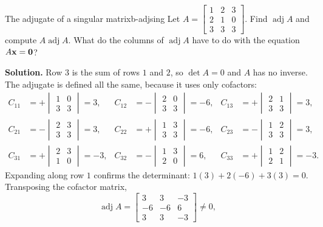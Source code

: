 \documentclass[11pt]{article}
\begin{document}
\begin{exmp}{The adjugate of a singular matrix}{b-adjsing}
Let $A=\begin{bmatrix}1&2&3\\2&1&0\\3&3&3\end{bmatrix}$. Find $\operatorname{adj}A$ and compute $A\operatorname{adj}A$. What do the columns of $\operatorname{adj}A$ have to do with the equation $A\mathbf{x}=\mathbf{0}$?

\textbf{Solution.} Row $3$ is the sum of rows $1$ and $2$, so $\det A=0$ and $A$ has no inverse. The adjugate is defined all the same, because it uses only cofactors:
\begin{align*}
C_{11}&=+\begin{vmatrix}1&0\\3&3\end{vmatrix}=3, & C_{12}&=-\begin{vmatrix}2&0\\3&3\end{vmatrix}=-6, & C_{13}&=+\begin{vmatrix}2&1\\3&3\end{vmatrix}=3,\\
C_{21}&=-\begin{vmatrix}2&3\\3&3\end{vmatrix}=3, & C_{22}&=+\begin{vmatrix}1&3\\3&3\end{vmatrix}=-6, & C_{23}&=-\begin{vmatrix}1&2\\3&3\end{vmatrix}=3,\\
C_{31}&=+\begin{vmatrix}2&3\\1&0\end{vmatrix}=-3, & C_{32}&=-\begin{vmatrix}1&3\\2&0\end{vmatrix}=6, & C_{33}&=+\begin{vmatrix}1&2\\2&1\end{vmatrix}=-3.
\end{align*}
Expanding along row $1$ confirms the determinant: $1(3)+2(-6)+3(3)=0$. Transposing the cofactor matrix,
\[
\operatorname{adj}A=\begin{bmatrix}3&3&-3\\-6&-6&6\\3&3&-3\end{bmatrix}\neq0,
\]
\end{exmp}
\end{document}
